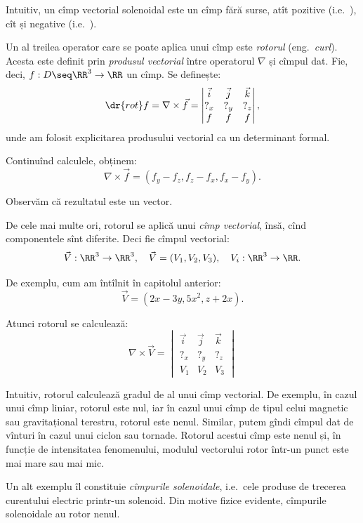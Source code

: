 Intuitiv, un cîmp vectorial solenoidal este un cîmp fără surse, atît pozitive
(i.e.\ ), cît și negative (i.e.\ ).

\vspace{1cm}
Un al treilea operator care se poate aplica unui cîmp este \emph{rotorul}
(eng.\ \emph{curl}). Acesta este definit prin \emph{produsul vectorial} între
operatorul $ \nabla $ și cîmpul dat. Fie, deci, $ f : D \seq \RR^3 \to \RR $
un cîmp. Se definește:
\[
  \dr{rot}f = \nabla \times \vec{f} = %
  \begin{vmatrix}
    \vec{i} & \vec{j} & \vec{k} \\
    ?_x & ?_y & ?_z \\
    f & f & f
  \end{vmatrix},
\]
unde am folosit explicitarea produsului vectorial ca un determinant formal.

Continuînd calculele, obținem:
\[
  \nabla \times \vec{f} = (f_y - f_z, f_z - f_x, f_x - f_y).
\]

Observăm că rezultatul este un vector.

De cele mai multe ori, rotorul se aplică unui \emph{cîmp vectorial}, însă,
cînd componentele sînt diferite. Deci fie cîmpul vectorial:
\[
  \vec{V} : \RR^3 \to \RR^3, \quad \vec{V} = (V_1, V_2, V_3), \quad V_i : \RR^3 \to \RR.
\]

De exemplu, cum am întîlnit în capitolul anterior:
\[
  \vec{V} = (2x - 3y, 5x^2, z + 2x).
\]

Atunci rotorul se calculează:
\[
  \nabla \times \vec{V} = %
  \begin{vmatrix}
    \vec{i} & \vec{j} & \vec{k} \\
    ?_x & ?_y & ?_z \\
    V_1 & V_2 & V_3
  \end{vmatrix}
\]

Intuitiv, rotorul calculează gradul de  al unui cîmp vectorial. De exemplu,
în cazul unui cîmp liniar, rotorul este nul, iar în cazul unui cîmp de tipul celui
magnetic sau gravitațional terestru, rotorul este nenul. Similar, putem gîndi cîmpul
dat de vînturi în cazul unui ciclon sau tornade. Rotorul acestui cîmp este nenul și,
în funcție de intensitatea fenomenului, modulul vectorului rotor într-un punct
este mai mare sau mai mic.

Un alt exemplu îl constituie \emph{cîmpurile solenoidale}, i.e.\ cele produse
de trecerea curentului electric printr-un solenoid. Din motive fizice evidente,
cîmpurile solenoidale au rotor nenul.

